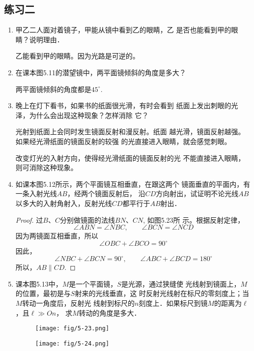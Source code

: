 \subsection{练习二}
\begin{enumerate}
    \item 甲乙二人面对着镜子，甲能从镜中看到乙的眼睛，乙
    是否也能看到甲的眼睛？说明理由．

    \begin{solution}
        乙能看到甲的眼睛。因为光路是可逆的。
    \end{solution}
    
    \item 在课本图5.11的潜望镜中，两平面镜倾斜的角度是多大？

    \begin{solution}
        两平面镜倾斜的角度都是$45^{\circ}$.
    \end{solution}
    
    \item 晚上在灯下看书，如果书的纸面很光滑，有时会看到
    纸面上发出刺眼的光泽，为什么会出现这种现象？怎样消除
    它？

    \begin{solution}
        光射到纸面上会同时发生镜面反射和漫反射。纸面
        越光滑，镜面反射越强。如果经光滑纸面的镜面反射的较强
        的光直接进入眼睛，就会感觉刺眼。

        改变灯光的入射方向，使得经光滑纸面的镜面反射的光
        不能直接进入眼睛，则可消除这种现象。
    \end{solution}

    \item 如课本图5.12所示，两个平面镜互相垂直，在跟这两个
    镜面垂直的平面内，有一条入射光线$AB$，经两个镜面反射后，
    沿$CD$方向射出，试证明不论光线$AB$以多大的入射角射入，反射光线$CD$都平行于$AB$射出．

    \begin{proof}
过$B$、$C$分别做镜面的法线$BN$、$CN$, 如图5.23所
示。根据反射定律，
\[\angle ABN=\angle NBC,\qquad \angle BCN=\angle NCD\]
因为两镜面互相垂直，所以
\[\angle OBC+\angle BCO=90^{\circ}\]
因此，
\[\angle NBC+\angle BCN=90^{\circ},\qquad 
\angle ABC+\angle BCD=180^{\circ}\]
所以，$AB\parallel CD$.
    \end{proof}
    \item 课本图5.13中，$M$是一个平面镜，$S$是光源，通过狭缝使
    光线射到镜面上，$M$的位置，最初是与$S$射来的光线垂直，这
    时反射光线射在标尺的零刻度上；当$M$转动一角度后，反射光
    线射到标尺的$n$刻度上．如果标尺到镜$M$的距离为$\ell$，且$\ell\gg On$，
    求$M$转动的角度是多大．
    \begin{figure}[htp]
        \centering
        \begin{minipage}[t]{0.48\textwidth}
        \centering
\texttt{[image: fig/5-23.png]}
        \caption{}
        \end{minipage}
        \begin{minipage}[t]{0.48\textwidth}
        \centering
\texttt{[image: fig/5-24.png]}
        \caption{}
        \end{minipage}
        \end{figure}


\end{enumerate}
